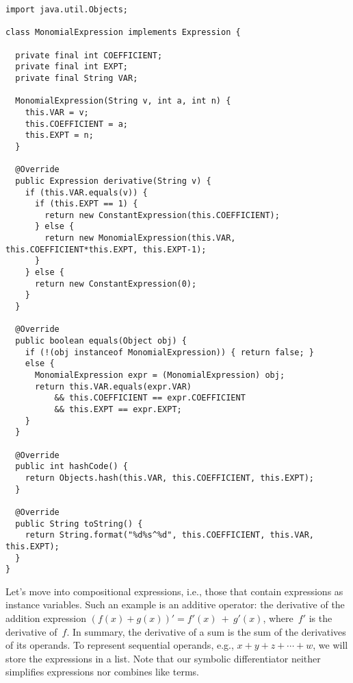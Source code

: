 \begin{lstlisting}[language=MyJava]
import java.util.Objects;

class MonomialExpression implements Expression {

  private final int COEFFICIENT;
  private final int EXPT;
  private final String VAR;

  MonomialExpression(String v, int a, int n) { 
    this.VAR = v;
    this.COEFFICIENT = a;
    this.EXPT = n;
  }

  @Override
  public Expression derivative(String v) { 
    if (this.VAR.equals(v)) {
      if (this.EXPT == 1) {
        return new ConstantExpression(this.COEFFICIENT);
      } else {
        return new MonomialExpression(this.VAR, this.COEFFICIENT*this.EXPT, this.EXPT-1);
      }
    } else {
      return new ConstantExpression(0);
    } 
  }

  @Override
  public boolean equals(Object obj) {
    if (!(obj instanceof MonomialExpression)) { return false; } 
    else { 
      MonomialExpression expr = (MonomialExpression) obj;
      return this.VAR.equals(expr.VAR)
          && this.COEFFICIENT == expr.COEFFICIENT 
          && this.EXPT == expr.EXPT;
    }
  }

  @Override
  public int hashCode() { 
    return Objects.hash(this.VAR, this.COEFFICIENT, this.EXPT); 
  }

  @Override
  public String toString() { 
    return String.format("%d%s^%d", this.COEFFICIENT, this.VAR, this.EXPT); 
  }
}
\end{lstlisting}

Let's move into compositional expressions, i.e., those that contain expressions as instance variables. 
Such an example is an additive operator: the derivative of the addition expression $(f(x) + g(x))' = f'(x)~+~g'(x)$, where~$f'$ is the derivative of~$f$. 
In summary, the derivative of a sum is the sum of the derivatives of its operands. 
To represent sequential operands, e.g., $x + y + z + \cdots + w$, we will store the expressions in a list. 
Note that our symbolic differentiator neither simplifies expressions nor combines like terms.

